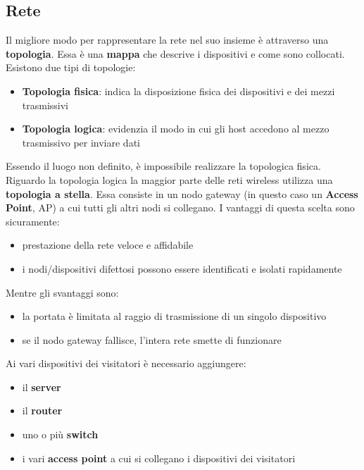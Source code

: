 \documentclass[12pt]{article}
\begin{document}
\subsection{Rete}
Il migliore modo per rappresentare la rete nel suo insieme è attraverso una \textbf{topologia}. Essa è una \textbf{mappa} che descrive i dispositivi e come sono collocati. Esistono due tipi di topologie:
\begin{itemize}
    \item \textbf{Topologia fisica}: indica la disposizione fisica dei dispositivi e dei mezzi trasmissivi
    \item \textbf{Topologia logica}: evidenzia il modo in cui gli host accedono al mezzo trasmissivo per inviare dati
\end{itemize}Essendo il luogo non definito, è impossibile realizzare la topologica fisica. Riguardo la topologia logica la maggior parte delle reti wireless utilizza una \textbf{topologia a stella}. Essa consiste in un nodo gateway (in questo caso un \textbf{Access Point}, AP) a cui tutti gli altri nodi si collegano. \cite{cisco} I vantaggi di questa scelta sono sicuramente:
\begin{itemize}
    \item prestazione della rete veloce e affidabile
    \item i nodi/dispositivi difettosi possono essere identificati e isolati rapidamente
\end{itemize}
Mentre gli svantaggi sono: 
\begin{itemize}
    \item la portata è limitata al raggio di trasmissione di un singolo dispositivo
    \item se il nodo gateway fallisce, l'intera rete smette di funzionare
\end{itemize}
\clearpage
Ai vari dispositivi dei visitatori è necessario aggiungere:
\begin{itemize}
    \item il \textbf{server}
    \item il \textbf{router}
    \item uno o più \textbf{switch}
    \item i vari \textbf{access point} a cui si collegano i dispositivi dei visitatori
\end{itemize}
\end{document}
